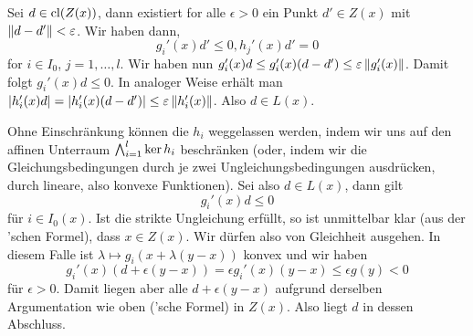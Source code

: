 \begin{solution}
\begin{tasks}
\begin{figure}[htb]
        \end{figure}     
        \item Sei $d\in\mathop\mathrm{cl}(Z(x))$, dann existiert for alle $\epsilon>0$ ein  Punkt $d'\in Z(x)$ mit $\left\Vert d-d' \right\Vert<\varepsilon$.
    Wir haben dann,
    $$
g_i'(x)d'\leq 0, h_j'(x)d'=0
$$
for $i\in I_0$, $j=1,\ldots,l$. Wir haben nun $g_i'(x)d\leq g_i'(x)(d-d')\leq \varepsilon \left\Vert g_i'(x) \right\Vert$. Damit folgt $g_i'(x)d\leq 0$. In analoger Weise erhält man $\left|h_i'(x)d\right|=\left|h_i'(x)(d-d')\right|\leq \varepsilon\left\Vert h_i'(x) \right\Vert$. Also $d\in L(x)$.
    \item Ohne Einschränkung können die $h_i$ weggelassen werden, indem wir uns auf den affinen Unterraum $\mathop\mathrm{\bigwedge}_{i=1}^l{\ker{h_i}}$ beschränken (oder, indem wir die Gleichungsbedingungen durch je zwei Ungleichungsbedingungen ausdrücken, durch lineare, also konvexe Funktionen). Sei also $d\in L(x)$, dann gilt
$$
g_i'(x)d\leq 0
$$
für $i\in I_0(x)$. Ist die strikte Ungleichung erfüllt, so ist unmittelbar klar (aus der 'schen Formel), dass $x\in Z(x)$. Wir dürfen also von Gleichheit ausgehen. In diesem Falle ist $\lambda \mapsto g_i(x+\lambda (y-x))$ konvex und wir haben
$$
g_i'(x)(d+\epsilon(y-x))=\epsilon g_i'(x)(y-x)\leq \epsilon g(y)<0
$$
für $\epsilon>0$. Damit liegen aber alle $d+\epsilon(y-x)$ aufgrund derselben Argumentation wie oben ('sche Formel) in $Z(x)$. Also liegt $d$ in dessen Abschluss.
    \end{tasks}
\end{solution}
